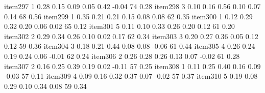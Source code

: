 \documentclass[10pt,man]{apa6}\usepackage{graphicx, color}
\begin{document}
\begin{Schunk}
\begin{Soutput}
item297   1 0.28 0.15 0.09 0.05 0.42 -0.04 74 0.28
item298   3 0.10 0.16 0.56 0.10 0.07  0.14 68 0.56
item299   1 0.35 0.21 0.21 0.15 0.08  0.08 62 0.35
item300   1 0.12 0.29 0.32 0.20 0.06  0.02 65 0.12
item301   5 0.11 0.10 0.33 0.26 0.20  0.12 61 0.20
item302   2 0.29 0.34 0.26 0.10 0.02  0.17 62 0.34
item303   3 0.20 0.27 0.36 0.05 0.12  0.12 59 0.36
item304   3 0.18 0.21 0.44 0.08 0.08 -0.06 61 0.44
item305   4 0.26 0.24 0.19 0.24 0.06 -0.01 62 0.24
item306   2 0.26 0.28 0.26 0.13 0.07 -0.02 61 0.28
item307   2 0.16 0.25 0.39 0.19 0.02 -0.11 57 0.25
item308   1 0.11 0.25 0.40 0.16 0.09 -0.03 57 0.11
item309   4 0.09 0.16 0.32 0.37 0.07 -0.02 57 0.37
item310   5 0.19 0.08 0.29 0.10 0.34  0.08 59 0.34
\end{Soutput}
\end{Schunk}
\end{document}

